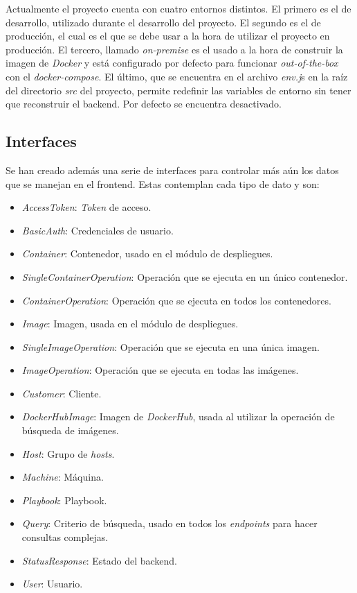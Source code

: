 \bigskip
Actualmente el proyecto cuenta con cuatro entornos distintos. El primero es el de desarrollo, utilizado durante el desarrollo del proyecto. El segundo es el de producción, el cual es el que se debe usar a la hora de utilizar el proyecto en producción. El tercero, llamado \textit{on-premise} es el usado a la hora de construir la imagen de \textit{Docker} y está configurado por defecto para funcionar \textit{out-of-the-box} con el \textit{docker-compose}. El último, que se encuentra en el archivo \textit{env.j}s en la raíz del directorio \textit{src} del proyecto, permite redefinir las variables de entorno sin tener que reconstruir el backend. Por defecto se encuentra desactivado.


\subsection{Interfaces}


Se han creado además una serie de interfaces para controlar más aún los datos que se manejan en el frontend. Estas contemplan cada tipo de dato y son:
\begin{itemize}
	\item \textit{AccessToken}: \textit{Token} de acceso.
	\item \textit{BasicAuth}: Credenciales de usuario.
	\item \textit{Container}: Contenedor, usado en el módulo de despliegues.
	\item \textit{SingleContainerOperation}: Operación que se ejecuta en un único contenedor.
	\item \textit{ContainerOperation}: Operación que se ejecuta en todos los contenedores.
	\item \textit{Image}: Imagen, usada en el módulo de despliegues.
	\item \textit{SingleImageOperation}: Operación que se ejecuta en una única imagen.
	\item \textit{ImageOperation}: Operación que se ejecuta en todas las imágenes.
	\item \textit{Customer}: Cliente.
	\item \textit{DockerHubImage}: Imagen de \textit{DockerHub}, usada al utilizar la operación de búsqueda de imágenes.
	\item \textit{Host}: Grupo de \textit{hosts}.
	\item \textit{Machine}: Máquina.
	\item \textit{Playbook}: Playbook.
	\item \textit{Query}: Criterio de búsqueda, usado en todos los \textit{endpoints} para hacer consultas complejas.
	\item \textit{StatusResponse}: Estado del backend.
	\item \textit{User}: Usuario.
\end{itemize}


